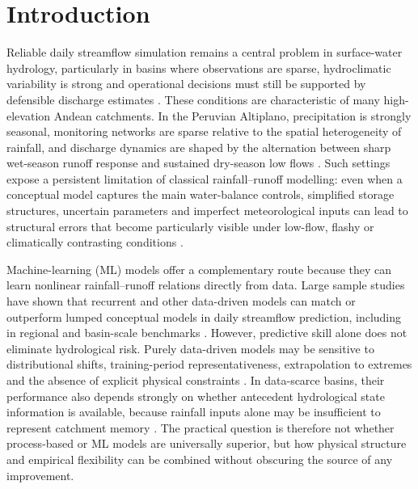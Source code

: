 \section{Introduction}\label{sec:introduction}

Reliable daily streamflow simulation remains a central problem in
surface-water hydrology, particularly in basins where observations are
sparse, hydroclimatic variability is strong and operational decisions
must still be supported by defensible discharge estimates
\citep{razavi2013streamflow,guo2021regionalization}. These conditions
are characteristic of many high-elevation Andean catchments. In the
Peruvian Altiplano, precipitation is strongly seasonal, monitoring
networks are sparse relative to the spatial heterogeneity of rainfall,
and discharge dynamics are shaped by the alternation between sharp
wet-season runoff response and sustained dry-season low flows
\citep{condom2004transient,zubieta2018hydrological,lima2025modeling}.
Such settings expose a persistent limitation of classical
rainfall--runoff modelling: even when a conceptual model captures the
main water-balance controls, simplified storage structures, uncertain
parameters and imperfect meteorological inputs can lead to structural
errors that become particularly visible under low-flow, flashy or
climatically contrasting conditions
\citep{van2013influence,nauditt2017conceptual,ragettli2014evaluation}.

Machine-learning (ML) models offer a complementary route because they
can learn nonlinear rainfall--runoff relations directly from data. Large
sample studies have shown that recurrent and other data-driven models
can match or outperform lumped conceptual models in daily streamflow
prediction, including in regional and basin-scale benchmarks
\citep{kratzert2019towards,lees2021benchmarking,arsenault2022continuous}.
However, predictive skill alone does not eliminate hydrological risk.
Purely data-driven models may be sensitive to distributional shifts,
training-period representativeness, extrapolation to extremes and the
absence of explicit physical constraints
\citep{frame2021deep,zhong2023developing}. In data-scarce basins, their
performance also depends strongly on whether antecedent hydrological
state information is available, because rainfall inputs alone may be
insufficient to represent catchment memory
\citep{adnan2021comparison,okkan2021embedding}. The practical question
is therefore not whether process-based or ML models are universally
superior, but how physical structure and empirical flexibility can be
combined without obscuring the source of any improvement.

